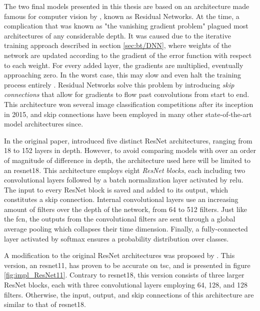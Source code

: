 The two final models presented in this thesis are based on an architecture made famous for computer vision by \textcite{he2015}, known as Residual Networks. At the time, a complication that was known as "the vanishing gradient problem"  plagued most architectures of any considerable depth. It was caused due to the iterative training approach described in section \ref{sec:bt/DNN}, where weights of the network are updated according to the gradient of the error function with respect to each weight. For every added layer, the gradients are multiplied, eventually approaching zero. In the worst case, this may slow and even halt the training process entirely \cite{basodi2020}. Residual Networks solve this problem by introducing \textit{skip connections} that allow for gradients to flow past convolutions from start to end. This architecture won several image classification competitions after its inception in 2015, and skip connections have been employed in many other state-of-the-art model architectures since.

In the original paper, \textcite{he2015} introduced five distinct ResNet architectures, ranging from 18 to 152 layers in depth. However, to avoid comparing models with over an order of magnitude of difference in depth, the architecture used here will be limited to an \acrfull{resnet18}. This architecture employs eight \textit{ResNet blocks}, each including two convolutional layers followed by a batch normalization layer activated by \acrshort{relu}. The input to every ResNet block is saved and added to its output, which constitutes a skip connection. Internal convolutional layers use an increasing amount of filters over the depth of the network, from 64 to 512 filters. Just like the \acrshort{fcn}, the outputs from the convolutional filters are sent through a global average pooling which collapses their time dimension. Finally, a fully-connected layer activated by softmax ensures a probability distribution over classes.

A modification to the original ResNet architectures was proposed by \textcite{wang2016}. This version, an \acrfull{resnet11}, has proven to be accurate on \acrshort{tsc}, and is presented in figure \ref{fig:impl_ResNet11}. Contrary to \acrshort{resnet18}, this version consists of three larger ResNet blocks, each with three convolutional layers employing 64, 128, and 128 filters. Otherwise, the input, output, and skip connections of this architecture are similar to that of \acrshort{resnet18}.


